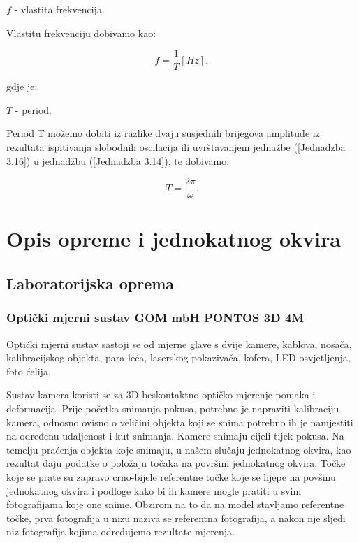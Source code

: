 \documentclass[12pt]{book}
\begin{document}
$f$ - vlastita frekvencija.

Vlastitu frekvenciju dobivamo kao:

\begin{equation}\label{Jednadzba 3.16}
	f = \frac{1}{T} [Hz],
\end{equation}

gdje je:

$T$ - period.

Period T možemo dobiti iz razlike dvaju susjednih brijegova amplitude iz rezultata ispitivanja slobodnih oscilacija ili uvrštavanjem jednažbe (\ref{Jednadzba 3.16}) u jednadžbu (\ref{Jednadzba 3.14}), te dobivamo:

\begin{equation}\label{Jednadzba 3.17}
	T = \frac{2\pi}{\omega}.
\end{equation}



\chapter{Opis opreme i jednokatnog okvira}

\section{Laboratorijska oprema}

\subsection{Opti\v cki mjerni sustav GOM mbH PONTOS 3D 4M}

Optički mjerni sustav sastoji se od mjerne glave s dvije kamere, kablova, nosača, kalibracijskog objekta, para leća, laserskog pokazivača, kofera, LED osvjetljenja, foto ćelija.

Sustav kamera koristi se za 3D beskontaktno optičko mjerenje pomaka i deformacija. Prije početka snimanja pokusa, potrebno je napraviti kalibraciju kamera, odnosno ovisno o veličini objekta koji se snima potrebno ih je namjestiti na određenu udaljenost i kut snimanja. Kamere snimaju cijeli tijek pokusa. Na temelju praćenja objekta koje snimaju, u našem slučaju jednokatnog okvira, kao rezultat daju podatke o položaju točaka na površini jednokatnog okvira. Točke koje se prate su zapravo crno-bijele referentne točke koje se lijepe na povšinu jednokatnog okvira i podloge kako bi ih kamere mogle pratiti u svim fotografijama koje one snime. Obzirom na to da na model stavljamo referentne točke, prva fotografija u nizu naziva se referentna fotografija, a nakon nje sljedi niz fotografija kojima određujemo rezultate mjerenja.
\vspace{1cm}
\end{document}
